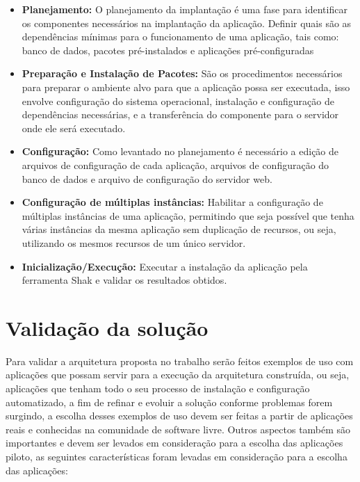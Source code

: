 \begin{itemize}
  \item  \textbf{Planejamento:} O planejamento da implantação é uma fase para
  identificar os componentes necessários na implantação da aplicação. Definir
  quais são as dependências mínimas
  para o funcionamento de uma aplicação, tais como: banco de dados, pacotes
  pré-instalados e aplicações pré-configuradas
  \item  \textbf{Preparação e Instalação de Pacotes:} São os procedimentos necessários
   para preparar o ambiente alvo para que a aplicação
  possa ser executada, isso envolve configuração do sistema operacional, instalação
  e configuração de dependências necessárias, e a transferência do componente
  para o servidor onde ele será executado.
  \item  \textbf{Configuração:} Como levantado no planejamento é necessário a
  edição de arquivos de configuração
  de cada aplicação, arquivos de configuração do banco de dados e arquivo de configuração
  do servidor web.
  \item  \textbf{Configuração de múltiplas instâncias:} Habilitar a configuração
  de múltiplas instâncias de uma aplicação, permitindo que seja possível que
  tenha várias instâncias da mesma aplicação sem duplicação de recursos, ou seja,
  utilizando os mesmos recursos de um único servidor.
  \item  \textbf{Inicialização/Execução:} Executar a instalação da aplicação pela
  ferramenta Shak e validar os resultados obtidos.
\end{itemize}

\section{Validação da solução}
\label{subsection:validacao}

Para validar a arquitetura proposta no trabalho serão feitos exemplos de uso
com aplicações que possam servir para a execução da arquitetura construída, ou seja,
aplicações que tenham todo o seu processo de instalação e configuração automatizado, a
fim de refinar e evoluir a solução conforme problemas forem surgindo, a escolha
desses exemplos de uso devem ser feitas a partir de aplicações reais e
conhecidas na comunidade de software livre. Outros aspectos também são importantes e
devem ser levados em consideração para a escolha das
aplicações piloto, as seguintes características foram levadas em consideração
para a escolha das aplicações:

